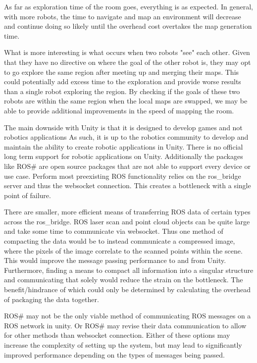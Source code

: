 \documentclass[11pt, conference]{IEEEtran}
\begin{document}
As far as exploration time of the room goes, everything is as expected. In general, with more robots, the time to navigate and map an environment will decrease and continue doing so likely until the overhead cost overtakes the map generation time.

What is more interesting is what occurs when two robots "see" each other. Given that they have no directive on where the goal of the other robot is, they may opt to go explore the same region after meeting up and merging their maps. This could potentially add excess time to the exploration and provide worse results than a single robot exploring the region. By checking if the goals of these two robots are within the same region when the local maps are swapped, we may be able to provide additional improvements in the speed of mapping the room.

The main downside with Unity is that it is designed to develop games and not robotics applications As such, it is up to the robotics community to develop and maintain the ability to create robotic applications in Unity. There is no official long term support for robotic applications on Unity. Additionally the packages like ROS\# are open source packages that are not able to support every device or use case. Perform most preexisting ROS functionality relies on the ros\_bridge server and thus the websocket connection. This creates a bottleneck with a single point of failure.

There are smaller, more efficient means of transferring ROS data of certain types across the ros\_bridge. ROS laser scan and point cloud objects can be quite large and take some time to communicate via websocket. Thus one method of compacting the data would be to instead communicate a compressed image, where the pixels of the image correlate to the scanned points within the scene. This would improve the message passing performance to and from Unity. Furthermore, finding a means to compact all information into a singular structure and communicating that solely would reduce the strain on the bottleneck. The benefit/hindrance of which could only be determined by calculating the overhead of packaging the data together.

ROS\# may not be the only viable method of communicating ROS messages on a ROS network in unity. \cite{ros2unity} Or ROS\# may revise their data communication to allow for other methods than websocket connection. Either of these options may increase the complexity of setting up the system, but may lead to significantly improved performance depending on the types of messages being passed.
\end{document}

